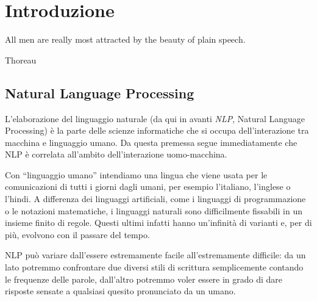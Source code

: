\chapter{Introduzione}
\epigraph{All men are really most attracted by the beauty of plain speech.}{Thoreau}

\section{Natural Language Processing}

L'elaborazione del linguaggio naturale (da qui in avanti \emph{NLP}, Natural Language Processing) è la parte delle scienze informatiche che si occupa dell'interazione tra macchina e linguaggio umano. Da questa premessa segue immediatamente che NLP è correlata all'ambito dell'interazione uomo-macchina.

Con ``linguaggio umano'' intendiamo una lingua che viene usata per le comunicazioni di tutti i giorni dagli umani, per esempio l'italiano, l'inglese o l'hindi. A differenza dei linguaggi artificiali, come i linguaggi di programmazione o le notazioni matematiche, i linguaggi naturali sono difficilmente fissabili in un insieme finito di regole. Questi ultimi infatti hanno un'infinità di varianti e, per di più, evolvono con il passare del tempo.

NLP può variare dall'essere estremamente facile all'estremamente difficile: da un lato potremmo confrontare due diversi stili di scrittura semplicemente contando le frequenze delle parole, dall'altro potremmo voler essere in grado di dare risposte sensate a qualsiasi quesito pronunciato da un umano.

